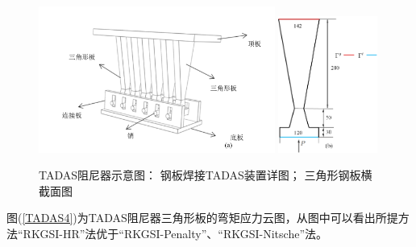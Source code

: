 \begin{figure}[H]
    \centering
    \begin{subcaptiongroup}
            \includegraphics[width=0.69\textwidth]{figure/DAMPER/TADAS/2.png}
            \label{TADAS22}
            \includegraphics[width=0.29\textwidth]{figure/DAMPER/TADAS/3.png}
            \label{TADAS23}
            \end{subcaptiongroup}
        \caption{TADAS阻尼器示意图\cite{mohammadi2017}： 钢板焊接TADAS装置详图； 三角形钢板横截面图}
    \label{TADAS2}
\end{figure}
图(\ref{TADAS4})为TADAS阻尼器三角形板的弯矩应力云图，从图中可以看出所提方法“RKGSI-HR”法优于“RKGSI-Penalty”、“RKGSI-Nitsche”法。
\newpage
